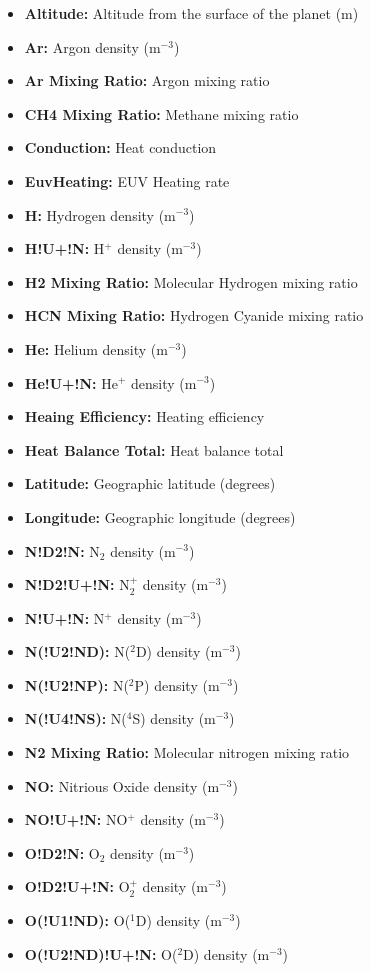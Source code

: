 \begin{itemize}
\item[]{\bf Altitude:} Altitude from the surface of the planet (m)
\item[]{\bf Ar:} Argon density (m$^{-3}$)
\item[]{\bf Ar Mixing Ratio:} Argon mixing ratio
\item[]{\bf CH4 Mixing Ratio:} Methane mixing ratio
\item[]{\bf Conduction:} Heat conduction
\item[]{\bf EuvHeating:} EUV Heating rate
\item[]{\bf H:} Hydrogen density (m$^{-3}$)
\item[]{\bf H!U+!N:} H$^+$ density (m$^{-3}$)
\item[]{\bf H2 Mixing Ratio:} Molecular Hydrogen mixing ratio
\item[]{\bf HCN Mixing Ratio:} Hydrogen Cyanide mixing ratio
\item[]{\bf He:} Helium density (m$^{-3}$)
\item[]{\bf He!U+!N:} He$^+$ density (m$^{-3}$)
\item[]{\bf Heaing Efficiency:} Heating efficiency
\item[]{\bf Heat Balance Total:} Heat balance total
\item[]{\bf Latitude:} Geographic latitude (degrees)
\item[]{\bf Longitude:} Geographic longitude (degrees)
\item[]{\bf N!D2!N:} N$_2$ density (m$^{-3}$)
\item[]{\bf N!D2!U+!N:} N$_2^+$ density (m$^{-3}$) 
\item[]{\bf N!U+!N:} N$^+$ density (m$^{-3}$)
\item[]{\bf N(!U2!ND):} N($^2$D) density (m$^{-3}$)
\item[]{\bf N(!U2!NP):} N($^2$P) density (m$^{-3}$)
\item[]{\bf N(!U4!NS):} N($^4$S) density (m$^{-3}$)
\item[]{\bf N2 Mixing Ratio:} Molecular nitrogen mixing ratio
\item[]{\bf NO:} Nitrious Oxide density (m$^{-3}$)
\item[]{\bf NO!U+!N:} NO$^+$ density (m$^{-3}$)
\item[]{\bf O!D2!N:} O$_2$ density (m$^{-3}$)
\item[]{\bf O!D2!U+!N:} O$_2^+$ density (m$^{-3}$)
\item[]{\bf O(!U1!ND):} O($^1$D) density (m$^{-3}$)
\item[]{\bf O(!U2!ND)!U+!N:} O($^2$D) density (m$^{-3}$)

\end{itemize}
